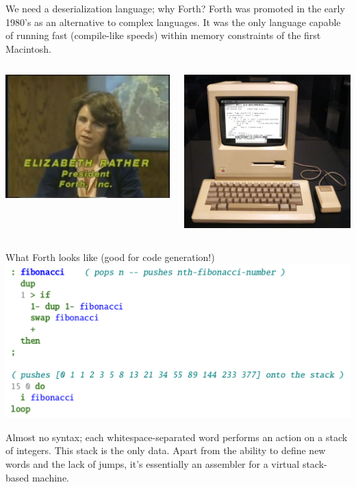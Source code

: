 \documentclass[aspectratio=169]{beamer}
\begin{document}
\begin{frame}{We need a deserialization language; why Forth?}
\vspace{0.5 cm}
Forth was promoted in the early 1980's as an alternative to complex languages. It was the only language capable of running fast (compile-like speeds) within memory constraints of the first Macintosh.

\vspace{0.5 cm}
\begin{columns}
\centering
\includegraphics[height=5 cm]{PLOTS/elizabeth-rather-the-computer-chronicles.png}

\centering
\includegraphics[height=5 cm]{PLOTS/macintosh-forth-code.jpg}
\end{columns}
\end{frame}

\begin{frame}{What Forth looks like (good for code generation!)}
\vspace{0.5 cm}
\includegraphics[width=0.9\linewidth]{PLOTS/forth-example.png}

\vspace{0.15 cm}
Almost no syntax; each whitespace-separated word performs an action on a stack of integers. This stack is the only data. Apart from the ability to define new words and the lack of jumps, it's essentially an assembler for a virtual stack-based machine.
\end{frame}
\end{document}
